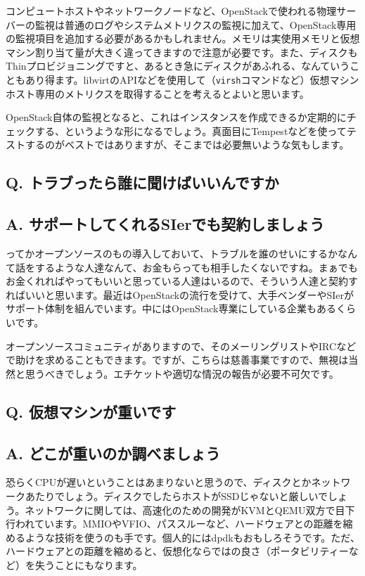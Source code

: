 \documentclass[9pt,b5paper,tombo,openany]{jsbook}
\begin{document}
コンピュートホストやネットワークノードなど、OpenStackで使われる物理サーバーの監視は普通のログやシステムメトリクスの監視に加えて、OpenStack専用の監視項目を追加する必要があるかもしれません。メモリは実使用メモリと仮想マシン割り当て量が大きく違ってきますので注意が必要です。また、ディスクもThinプロビジョニングですと、あるとき急にディスクがあふれる、なんていうこともあり得ます。libvirtのAPIなどを使用して（\verb|virsh|コマンドなど）仮想マシンホスト専用のメトリクスを取得することを考えるとよいと思います。

OpenStack自体の監視となると、これはインスタンスを作成できるか定期的にチェックする、というような形になるでしょう。真面目にTempestなどを使ってテストするのがベストではありますが、そこまでは必要無いような気もします。

\subsection*{{\LARGE\bfseries Q.} トラブったら誰に聞けばいいんですか}
\subsection*{{\LARGE\bfseries A.} サポートしてくれるSIerでも契約しましょう}
ってかオープンソースのもの導入しておいて、トラブルを誰のせいにするかなんて話をするような人達なんて、お金もらっても相手したくないですね。まぁでもお金くれればやってもいいと思っている人達はいるので、そういう人達と契約すればいいと思います。最近はOpenStackの流行を受けて、大手ベンダーやSIerがサポート体制を組んでいます。中にはOpenStack専業にしている企業もあるくらいです。

オープンソースコミュニティがありますので、そのメーリングリストやIRCなどで助けを求めることもできます。ですが、こちらは慈善事業ですので、無視は当然と思うべきでしょう。エチケットや適切な情況の報告が必要不可欠です。

\subsection*{{\LARGE\bfseries Q.} 仮想マシンが重いです}
\subsection*{{\LARGE\bfseries A.} どこが重いのか調べましょう}
恐らくCPUが遅いということはあまりないと思うので、ディスクとかネットワークあたりでしょう。ディスクでしたらホストがSSDじゃないと厳しいでしょう。ネットワークに関しては、高速化のための開発がKVMとQEMU双方で目下行われています。MMIOやVFIO、パススルーなど、ハードウェアとの距離を縮めるような技術を使うのも手です。個人的にはdpdkもおもしろそうです。ただ、ハードウェアとの距離を縮めると、仮想化ならではの良さ（ポータビリティーなど）を失うことにもなります。
\end{document}
